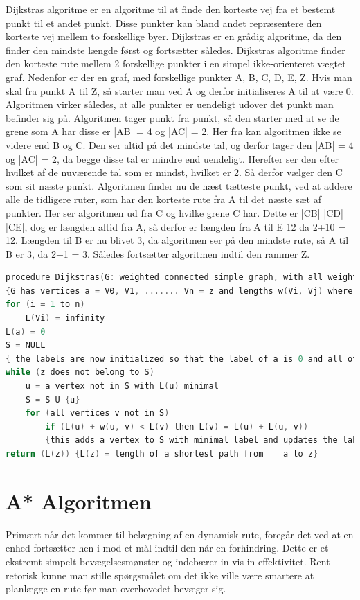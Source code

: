 Dijkstras algoritme er en algoritme til at finde den korteste vej fra et bestemt punkt til et andet punkt. Disse punkter kan bland andet repræsentere den korteste vej mellem to forskellige byer. Dijkstras er en grådig algoritme, da den finder den mindste længde først og fortsætter således.\cite{DMATBOGEN}
Dijkstras algoritme finder den korteste rute mellem 2 forskellige punkter i en simpel ikke-orienteret vægtet graf. Nedenfor er der en graf, med forskellige punkter {A, B, C, D, E, Z}. Hvis man skal fra punkt A til Z, så starter man ved A og derfor initialiseres A til at være 0. Algoritmen virker således, at alle punkter er uendeligt udover det punkt man befinder sig på. Algoritmen tager punkt fra punkt, så den starter med at se de grene som A har disse er |AB| = 4 og |AC| = 2. Her fra kan algoritmen ikke se videre end B og C. Den ser altid på det mindste tal, og derfor tager den |AB| = 4 og |AC| = 2, da begge disse tal er mindre end uendeligt. Herefter ser den efter hvilket af de nuværende tal som er mindst, hvilket er 2. Så derfor vælger den C som sit næste punkt. Algoritmen finder nu de næst tætteste punkt, ved at addere alle de tidligere ruter, som har den korteste rute fra A til det næste sæt af punkter. Her ser algoritmen ud fra C og hvilke grene C har. Dette er |CB| |CD| |CE|, dog er længden altid fra A, så derfor er længden fra A til E 12 da 2+10 = 12. Længden til B er nu blivet 3, da algoritmen ser på den mindste rute, så A til B er 3, da 2+1 = 3. Således fortsætter algoritmen indtil den rammer Z.\cite{DMATBOGEN}

\begin{lstlisting}[language=C,caption={Dijkstras angivet som eksempel i pseudo-kode},label={lst:DijsktrasPseudo1}]
	procedure Dijkstras(G: weighted connected simple graph, with all weights positive)
{G has vertices a = V0, V1, ....... Vn = z and lengths w(Vi, Vj) where w(Vi,Vj) = infinity if{Vi, Vj} is not an edge in G}
for (i = 1 to n)
	L(Vi) = infinity
L(a) = 0
S = NULL
{ the labels are now initialized so that the label of a is 0 and all other labels are infinity, and S is the empty set }
while (z does not belong to S)
	u = a vertex not in S with L(u) minimal
	S = S U {u}
	for (all vertices v not in S)
		if (L(u) + w(u, v) < L(v) then L(v) = L(u) + L(u, v))
		{this adds a vertex to S with minimal label and updates the labels of vertices not in S}
return (L(z)) {L(z) = length of a shortest path from 	a to z}
\end{lstlisting}

\section{A* Algoritmen}
Primært når det kommer til belægning af en dynamisk rute, foregår det ved at en enhed fortsætter hen i mod et mål indtil den når en forhindring. Dette er et ekstremt simpelt bevægelsesmønster og indebærer in vis in-effektivitet. Rent retorisk kunne man stille spørgsmålet om det ikke ville være smartere at planlægge en rute før man overhovedet bevæger sig.

